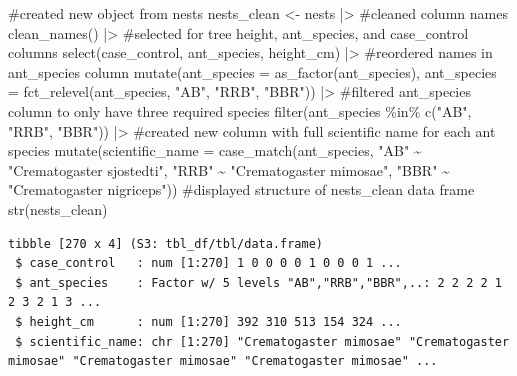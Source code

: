 \documentclass[
  letterpaper,
  DIV=11,
  numbers=noendperiod]{scrartcl}
\newenvironment{Shaded}{\begin{snugshade}}{\end{snugshade}}
\newcommand{\AttributeTok}[1]{\textcolor[rgb]{0.40,0.45,0.13}{#1}}
\newcommand{\CommentTok}[1]{\textcolor[rgb]{0.37,0.37,0.37}{#1}}
\newcommand{\FunctionTok}[1]{\textcolor[rgb]{0.28,0.35,0.67}{#1}}
\newcommand{\NormalTok}[1]{\textcolor[rgb]{0.00,0.23,0.31}{#1}}
\newcommand{\OtherTok}[1]{\textcolor[rgb]{0.00,0.23,0.31}{#1}}
\newcommand{\SpecialCharTok}[1]{\textcolor[rgb]{0.37,0.37,0.37}{#1}}
\newcommand{\StringTok}[1]{\textcolor[rgb]{0.13,0.47,0.30}{#1}}
\begin{document}
\begin{Shaded}
\begin{Highlighting}[]
\CommentTok{\#created new object from nests}
\NormalTok{nests\_clean }\OtherTok{\textless{}{-}}\NormalTok{ nests }\SpecialCharTok{|\textgreater{}}
\CommentTok{\#cleaned column names    }
  \FunctionTok{clean\_names}\NormalTok{() }\SpecialCharTok{|\textgreater{}} 
\CommentTok{\#selected for tree height, ant\_species, and case\_control columns }
  \FunctionTok{select}\NormalTok{(case\_control, ant\_species, height\_cm) }\SpecialCharTok{|\textgreater{}} 
\CommentTok{\#reordered names in ant\_species column }
  \FunctionTok{mutate}\NormalTok{(}\AttributeTok{ant\_species =} \FunctionTok{as\_factor}\NormalTok{(ant\_species),}
         \AttributeTok{ant\_species =} \FunctionTok{fct\_relevel}\NormalTok{(ant\_species,}
                                   \StringTok{"AB"}\NormalTok{,}
                                   \StringTok{"RRB"}\NormalTok{,}
                                   \StringTok{"BBR"}\NormalTok{)) }\SpecialCharTok{|\textgreater{}} 
\CommentTok{\#filtered ant\_species column to only have three required species  }
  \FunctionTok{filter}\NormalTok{(ant\_species }\SpecialCharTok{\%in\%} \FunctionTok{c}\NormalTok{(}\StringTok{"AB"}\NormalTok{, }\StringTok{"RRB"}\NormalTok{, }\StringTok{"BBR"}\NormalTok{)) }\SpecialCharTok{|\textgreater{}} 
\CommentTok{\#created new column with full scientific name for each ant species }
  \FunctionTok{mutate}\NormalTok{(}\AttributeTok{scientific\_name =} \FunctionTok{case\_match}\NormalTok{(ant\_species,}
    \StringTok{"AB"} \SpecialCharTok{\textasciitilde{}} \StringTok{"Crematogaster sjostedti"}\NormalTok{,}
    \StringTok{"RRB"} \SpecialCharTok{\textasciitilde{}} \StringTok{"Crematogaster mimosae"}\NormalTok{,}
    \StringTok{"BBR"} \SpecialCharTok{\textasciitilde{}} \StringTok{"Crematogaster nigriceps"}\NormalTok{)) }
\CommentTok{\#displayed structure of nests\_clean data frame}
\FunctionTok{str}\NormalTok{(nests\_clean)}
\end{Highlighting}
\end{Shaded}

\begin{verbatim}
tibble [270 x 4] (S3: tbl_df/tbl/data.frame)
 $ case_control   : num [1:270] 1 0 0 0 0 1 0 0 0 1 ...
 $ ant_species    : Factor w/ 5 levels "AB","RRB","BBR",..: 2 2 2 2 1 2 3 2 1 3 ...
 $ height_cm      : num [1:270] 392 310 513 154 324 ...
 $ scientific_name: chr [1:270] "Crematogaster mimosae" "Crematogaster mimosae" "Crematogaster mimosae" "Crematogaster mimosae" ...
\end{verbatim}
\end{document}
